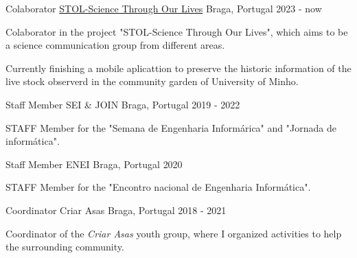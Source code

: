 

\begin{cventries}
  \cventry
  {Colaborator} %
  {\href{https://stolscience.com/}{STOL-Science Through Our Lives}} %
  {Braga, Portugal} %
  {2023 - now} %
  {
    \begin{cvitems} %
      \item {Colaborator in the project "STOL-Science Through Our Lives", which aims to be a science communication group from different areas.}
      \item {Currently finishing a mobile aplicattion to preserve the historic information of the live stock observerd in the community garden of University of Minho.}
    \end{cvitems}
}

\cventry
  {Staff Member} %
  {SEI \& JOIN} %
  {Braga, Portugal} %
  {2019 - 2022} %
  {
    \begin{cvitems} %
      \item {STAFF Member for the "Semana de Engenharia Informárica" and "Jornada de informática".}
    \end{cvitems}
}

  \cventry
  {Staff Member} %
  {ENEI} %
  {Braga, Portugal} %
  {2020} %
  {
    \begin{cvitems} %
      \item {STAFF Member for the "Encontro nacional de Engenharia Informática".}
    \end{cvitems}
  }

\cventry
    {Coordinator} %
    {Criar Asas} %
    {Braga, Portugal} %
    {2018 - 2021} %
    {
      \begin{cvitems} %
        \item {Coordinator of the \textit{Criar Asas} youth group, where I organized activities to help the surrounding community.}
      \end{cvitems}
    }
\end{cventries}
